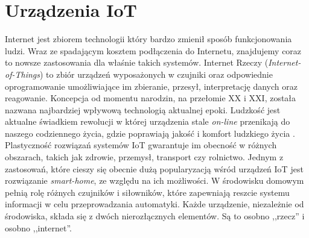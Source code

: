 \section{Urządzenia IoT}


Internet jest zbiorem technologii który bardzo zmienił sposób funkcjonowania ludzi. Wraz ze spadającym kosztem podłączenia do Internetu, znajdujemy coraz to nowsze zastosowania dla właśnie takich systemów. Internet Rzeczy (\textit{Internet-of-Things}) to zbiór urządzeń wyposażonych w czujniki oraz odpowiednie oprogramowanie umożliwiające im zbieranie, przesył, interpretację danych oraz reagowanie. Koncepcja od momentu narodzin, na przełomie XX i XXI, została nazwana najbardziej wpływową technologią aktualnej epoki. Ludzkość jest aktualne świadkiem rewolucji w której urządzenia stale \textit{on-line} przenikają do naszego codziennego życia, gdzie poprawiają jakość i komfort ludzkiego życia \cite{iot_improves_lifes}. Plastyczność rozwiązań systemów IoT gwarantuje im obecność w różnych obszarach, takich jak zdrowie, przemysł, transport czy rolnictwo. Jednym z zastosowań, które cieszy się obecnie dużą popularyzacją wśród urządzeń IoT jest rozwiązanie \textit{smart-home}, ze względu na ich możliwości. W środowisku domowym pełnią rolę różnych czujników i siłowników, które zapewniają reszcie systemu informacji w celu przeprowadzania automatyki. Każde urządzenie, niezależnie od środowiska, składa się z dwóch nierozłącznych elementów. Są to osobno ,,rzecz'' i osobno ,,internet''.


